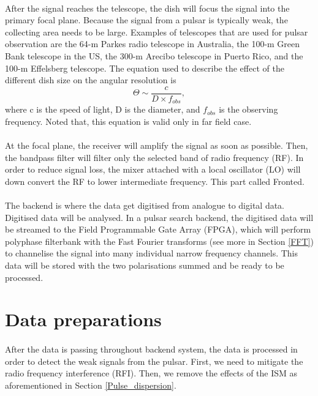 \documentclass[thesis_msc.tex]{subfiles}
\begin{document}
		\paragraph{} After the signal reaches the telescope, the dish will focus the signal into the primary focal plane. Because the signal from a pulsar is typically weak, the collecting area needs to be large. Examples of telescopes that are used for pulsar observation are the 64-m Parkes radio telescope in Australia, the 100-m Green Bank telescope in the US, the 300-m Arecibo telescope in Puerto Rico, and the 100-m Effelsberg telescope. The equation used to describe the effect of the different dish size on the angular resolution is
        \begin{equation} \label{angular_res}
        \Theta \sim \frac{c}{D \times f_{obs}}, 
        \end{equation}
where c is the speed of light, D is the diameter, and $f_{obs}$ is the observing frequency. Noted that, this equation is valid only in far field case.
        \paragraph{} At the focal plane, the receiver will amplify the signal as soon as possible. Then, the bandpass filter will filter only the selected band of radio frequency (RF). In order to reduce signal loss, the mixer attached with a local oscillator (LO) will down convert the RF to lower intermediate frequency. This part called Fronted. 
		\paragraph{} The backend is where the data get digitised from analogue to digital data. Digitised data will be analysed. %
		In a pulsar search backend, the digitised data will be streamed to the Field Programmable Gate Array (FPGA), which will perform polyphase filterbank with the Fast Fourier transforms (see more in Section \ref{FFT}) to channelise the signal into many individual narrow frequency channels. This data will be stored with the two polarisations summed and be ready to be processed.  
            \section{Data preparations} 
            \paragraph{} After the data is passing throughout backend system, the data is processed in order to detect the weak signals from the pulsar. First, we need to mitigate the radio frequency interference (RFI). Then, we remove the effects of the ISM as aforementioned in Section \ref{Pulse_dispersion}.    
            
\end{document}

